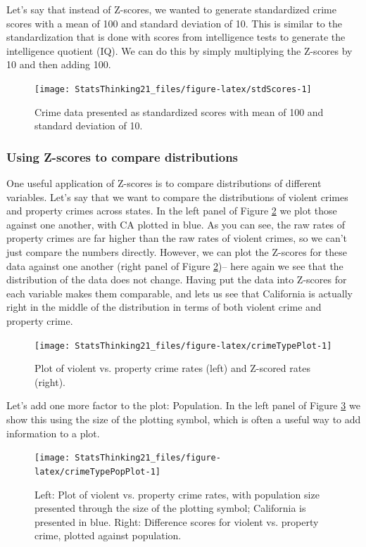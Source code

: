 \documentclass[12pt,]{book}
\theoremstyle{definition}
\theoremstyle{definition}
\theoremstyle{definition}
\theoremstyle{remark}
\begin{document}
Let's say that instead of Z-scores, we wanted to generate standardized crime scores with a mean of 100 and standard deviation of 10. This is similar to the standardization that is done with scores from intelligence tests to generate the intelligence quotient (IQ). We can do this by simply multiplying the Z-scores by 10 and then adding 100.

\begin{figure}
\texttt{[image: StatsThinking21\_files/figure-latex/stdScores-1]} \caption{Crime data presented as standardized scores with mean of  100 and standard deviation of 10.}\label{fig:stdScores}
\end{figure}

\hypertarget{using-z-scores-to-compare-distributions}{%
\subsubsection{Using Z-scores to compare distributions}\label{using-z-scores-to-compare-distributions}}

One useful application of Z-scores is to compare distributions of different variables. Let's say that we want to compare the distributions of violent crimes and property crimes across states. In the left panel of Figure \ref{fig:crimeTypePlot} we plot those against one another, with CA plotted in blue. As you can see, the raw rates of property crimes are far higher than the raw rates of violent crimes, so we can't just compare the numbers directly. However, we can plot the Z-scores for these data against one another (right panel of Figure \ref{fig:crimeTypePlot})-- here again we see that the distribution of the data does not change. Having put the data into Z-scores for each variable makes them comparable, and lets us see that California is actually right in the middle of the distribution in terms of both violent crime and property crime.

\begin{figure}
\texttt{[image: StatsThinking21\_files/figure-latex/crimeTypePlot-1]} \caption{Plot of violent vs. property crime rates (left) and Z-scored rates (right).}\label{fig:crimeTypePlot}
\end{figure}

Let's add one more factor to the plot: Population. In the left panel of Figure \ref{fig:crimeTypePopPlot} we show this using the size of the plotting symbol, which is often a useful way to add information to a plot.

\begin{figure}
\texttt{[image: StatsThinking21\_files/figure-latex/crimeTypePopPlot-1]} \caption{Left: Plot of violent vs. property crime rates, with population size presented through the size of the plotting symbol; California is presented in blue. Right: Difference scores for violent vs. property crime, plotted against population. }\label{fig:crimeTypePopPlot}
\end{figure}
\end{document}

